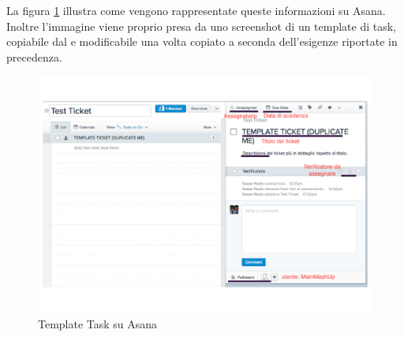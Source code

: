 			\noindent
			La figura \ref{fig:template_task_asana} illustra come vengono rappresentate queste informazioni su Asana. Inoltre l'immagine viene proprio presa da uno screenshot di un template di task, copiabile dal \roleProjectManager{} e modificabile una volta copiato a seconda dell'esigenze riportate in precedenza.
				\begin{figure}[htbp]
					\centering
					\includegraphics[width=14cm]{images/tpl_task_asana.pdf}
					\caption{Template Task su Asana}
					\label{fig:template_task_asana}
				\end{figure}

